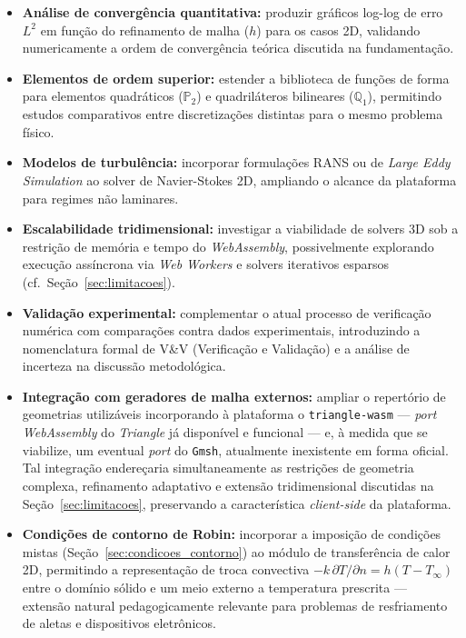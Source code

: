 \begin{itemize}
    \item \textbf{Análise de convergência quantitativa:} produzir gráficos log-log de erro $L^2$ em função do refinamento de malha ($h$) para os casos 2D, validando numericamente a ordem de convergência teórica discutida na fundamentação.

    \item \textbf{Elementos de ordem superior:} estender a biblioteca de funções de forma para elementos quadráticos ($\mathbb{P}_2$) e quadriláteros bilineares ($\mathbb{Q}_1$), permitindo estudos comparativos entre discretizações distintas para o mesmo problema físico.

    \item \textbf{Modelos de turbulência:} incorporar formulações RANS ou de \textit{Large Eddy Simulation} ao solver de Navier-Stokes 2D, ampliando o alcance da plataforma para regimes não laminares.

    \item \textbf{Escalabilidade tridimensional:} investigar a viabilidade de solvers 3D sob a restrição de memória e tempo do \textit{WebAssembly}, possivelmente explorando execução assíncrona via \textit{Web Workers} e solvers iterativos esparsos (cf.\ Seção~\ref{sec:limitacoes}).

    \item \textbf{Validação experimental:} complementar o atual processo de verificação numérica com comparações contra dados experimentais, introduzindo a nomenclatura formal de V\&V (Verificação e Validação) e a análise de incerteza na discussão metodológica.

    \item \textbf{Integração com geradores de malha externos:} ampliar o repertório de geometrias utilizáveis incorporando à plataforma o \texttt{triangle-wasm} \cite{TriangleWasm} --- \textit{port} \textit{WebAssembly} do \textit{Triangle} já disponível e funcional --- e, à medida que se viabilize, um eventual \textit{port} do \texttt{Gmsh}, atualmente inexistente em forma oficial. Tal integração endereçaria simultaneamente as restrições de geometria complexa, refinamento adaptativo e extensão tridimensional discutidas na Seção~\ref{sec:limitacoes}, preservando a característica \textit{client-side} da plataforma.

    \item \textbf{Condições de contorno de Robin:} incorporar a imposição de condições mistas (Seção~\ref{sec:condicoes_contorno}) ao módulo de transferência de calor 2D, permitindo a representação de troca convectiva $-k\,\partial T/\partial n = h(T - T_\infty)$ entre o domínio sólido e um meio externo a temperatura prescrita --- extensão natural pedagogicamente relevante para problemas de resfriamento de aletas e dispositivos eletrônicos.
\end{itemize}

